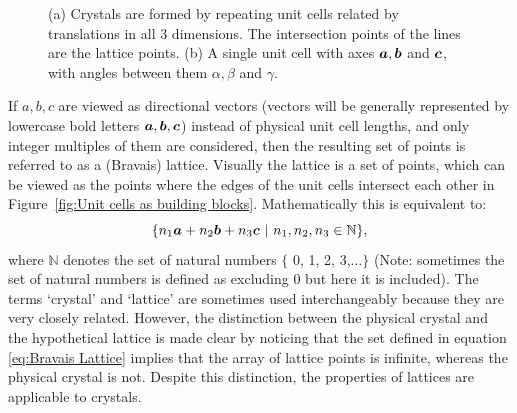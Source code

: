 \begin{figure}[H]
\begin{subfigure}[b]{0.4\textwidth}
                    \caption{}
                    \label{fig:Unit cell definition}
            \end{subfigure}
            \caption[Lattice definition.]{(a) Crystals are formed by repeating unit cells related by translations in all 3 dimensions.
            The intersection points of the lines are the lattice points.
            (b) A single unit cell with axes $\boldsymbol{a}, \boldsymbol{b}$ and $\boldsymbol{c}$, with angles between them $\alpha, \beta$ and $\gamma$. \cite{drenth2012}}
    		\label{fig:Introduction-Unit Cells}
        \end{figure}
        If $a, b, c$ are viewed as directional vectors (vectors will be generally represented by lowercase bold letters {$\boldsymbol{a}, \boldsymbol{b}, \boldsymbol{c}$}) instead of physical unit cell lengths, and only integer multiples of them are considered, then the resulting set of points is referred to as a (Bravais) lattice.
        Visually the lattice is a set of points, which can be viewed as the points where the edges of the unit cells intersect each other in Figure~\ref{fig:Unit cells as building blocks}.
        Mathematically this is equivalent to:
        \begin{equation}
            \{n_1 \boldsymbol{a} + n_2 \boldsymbol{b} + n_3 \boldsymbol{c}\ |\ n_1, n_2, n_3 \in \mathbb{N} \},
            \label{eq:Bravais Lattice}
        \end{equation}
        where $\mathbb{N}$ denotes the set of natural numbers $\{$ 0, 1, 2, 3,$\ldots \}$ (Note: sometimes the set of natural numbers is defined as excluding 0 but here it is included).
        The terms `crystal' and `lattice' are sometimes used interchangeably because they are very closely related.
        However, the distinction between the physical crystal and the hypothetical lattice is made clear by noticing that the set defined in equation \ref{eq:Bravais Lattice} implies that the array of lattice points is infinite, whereas the physical crystal is not.
        Despite this distinction, the properties of lattices are applicable to crystals.


